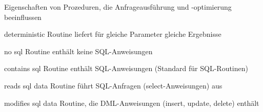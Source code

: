 \documentclass[a4paper]{article}
\begin{document}
\begin{multicols}{3}
    Eigenschaften von Prozeduren, die Anfrageausführung und -optimierung beeinflussen
    \begin{description*}
        \item[deterministic] Routine liefert für gleiche Parameter gleiche Ergebnisse
        \item[no sql] Routine enthält keine SQL-Anweisungen
        \item[contains sql] Routine enthält SQL-Anweisungen (Standard für SQL-Routinen)
        \item[reads sql data] Routine führt SQL-Anfragen (select-Anweisungen) aus
        \item[modifies sql data] Routine, die DML-Anweisungen (insert, update, delete) enthält
    \end{description*}

\end{multicols}
\end{document}
